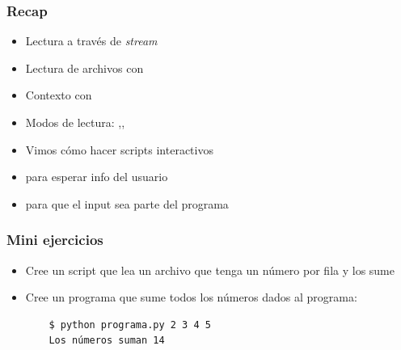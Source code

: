 \documentclass[14pt,aspectratio=169,xcolor=dvipsnames]{beamer}
\begin{document}
\begin{frame}\frametitle{Recap}
    \begin{itemize}
        \item Lectura a través de \emph{stream}
        \item Lectura de archivos con 
        \item Contexto con 
        \item Modos de lectura: ,,
        \item Vimos cómo hacer scripts interactivos
        \item {} para esperar info del usuario
        \item {} para que el input sea parte del programa
    \end{itemize}
\end{frame}
\begin{frame}
    \maketitle
\end{frame}
\begin{frame}[fragile]\frametitle{Mini ejercicios}
    \begin{itemize}
        \item Cree un script que lea un archivo que tenga un número por fila y los sume
        \item Cree un programa que sume todos los números dados al programa: 
        \begin{verbatim}
    $ python programa.py 2 3 4 5  
    Los números suman 14
        \end{verbatim}

    \end{itemize}
\end{frame}
\end{document}
